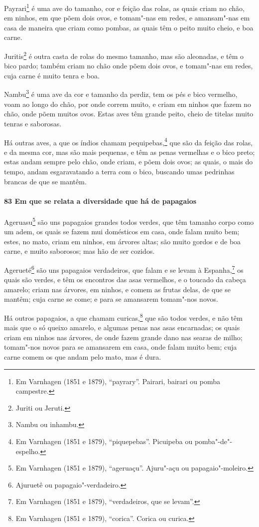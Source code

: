 \begin{linenumbers}
Payrari\footnote{ Em Varnhagen (1851 e 1879), ``payrary''. Pairari, bairari ou pomba
campestre.} é uma ave do tamanho, cor e feição das rolas, as quais criam no chão, em
ninhos, em que põem dois ovos, e tomam"-nas em redes, e amansam"-nas em casa de maneira que
criam como pombas, as quais têm o peito muito cheio, e boa carne.

Juritis\footnote{ Juriti ou Jeruti.} é outra casta de rolas do mesmo tamanho, mas são
aleonadas, e têm o bico pardo; também criam no chão onde põem dois ovos, e tomam"-nas em
redes, cuja carne é muito tenra e boa.

Nambu\footnote{ Nambu ou inhambu.} é uma ave da cor e tamanho da perdiz, tem os pés e bico
vermelho, voam ao longo do chão, por onde correm muito, e criam em ninhos que fazem no
chão, onde põem muitos ovos. Estas aves têm grande peito, cheio de titelas muito tenras e
saborosas.

Há outras aves, a que os índios chamam pequipebas,\footnote{ Em Varnhagen (1851 e 1879),
``piquepebas''. Picuipeba ou pomba"-de"-espelho.} que são da feição das rolas, e da mesma
cor, mas são mais pequenas, e têm as penas vermelhas e o bico preto; estas andam sempre
pelo chão, onde criam, e põem dois ovos; as quais, o mais do tempo, andam esgaravatando a
terra com o bico, buscando umas pedrinhas brancas de que se mantêm.

\paragraph{83 Em que se relata a diversidade que há de papagaios}\quad
Ageruasu\footnote{ Em Varnhagen (1851 e 1879), ``ageruaçu''. Ajuru"-açu ou
papagaio"-moleiro.} são uns papagaios grandes todos verdes, que têm tamanho corpo como um
adem, os quais se fazem mui domésticos em casa, onde falam muito bem; estes, no mato,
criam em ninhos, em árvores altas; são muito gordos e de boa carne, e muito saborosos; mas
hão de ser cozidos.

Agerueté\footnote{ Ajuruetê ou papagaio"-verdadeiro.} são uns papagaios verdadeiros, que
falam e se levam à Espanha,\footnote{ Em Varnhagen (1851 e 1879), ``verdadeiros, que se
levam''.} os quais são verdes, e têm os encontros das asas vermelhos, e o toucado da
cabeça amarelo; criam nas árvores, em ninhos, e comem as frutas delas, de que se mantêm;
cuja carne se come; e para se amansarem tomam"-nos novos.

Há outros papagaios, a que chamam curicas,\footnote{ Em Varnhagen (1851 e 1879),
``corica''. Corica ou curica.} que são todos verdes, e não têm mais que o só queixo
amarelo, e algumas penas nas asas encarnadas; os quais criam em ninhos nas árvores, de
onde fazem grande dano nas searas de milho; tomam"-nos novos para se amansarem em casa,
onde falam muito bem; cuja carne comem os que andam pelo mato, mas é dura.


\end{linenumbers}

